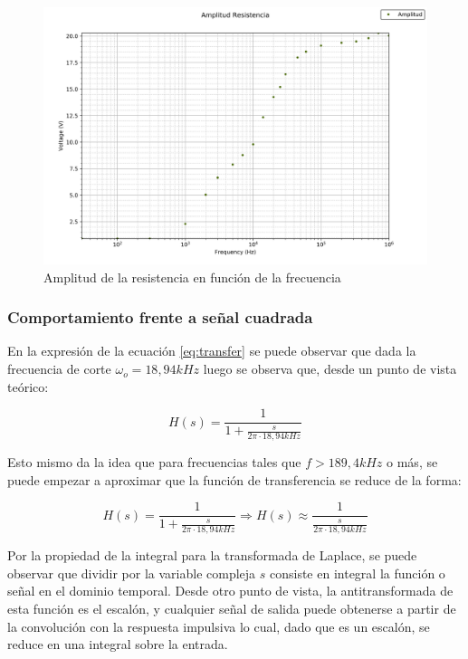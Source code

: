 \begin{figure}[H]
	\begin{center}
		\includegraphics[scale=0.65]{../Desarrollo/amplitud_resistencia.png}
		\caption{Amplitud de la resistencia en funci\'on de la frecuencia}
		\label{fig:amplitud_resistencia}
	\end{center}
\end{figure}

\subsubsection*{Comportamiento frente a se\~nal cuadrada}

En la expresi\'on de la ecuaci\'on \ref{eq:transfer} se puede observar que dada la frecuencia de corte $\omega_o = 18,94kHz$ luego se observa que, desde un punto de vista te\'orico:

\begin{equation}
	H(s) = \frac{1}{1 + \frac{s}{2 \pi \cdot 18,94kHz}}
\end{equation}

Esto mismo da la idea que para frecuencias tales que $f > 189,4kHz$ o m\'as, se puede empezar a aproximar que la funci\'on de transferencia se reduce de la forma:

\begin{equation}
	H(s) = \frac{1}{1 + \frac{s}{2 \pi \cdot 18,94kHz}} \Rightarrow
	H(s) \approx \frac{1}{\frac{s}{2 \pi \cdot 18,94kHz}}
\end{equation}

Por la propiedad de la integral para la transformada de Laplace, se puede observar que dividir por la variable compleja $s$ consiste en integral la funci\'on o se\~nal en el dominio temporal. Desde otro punto de vista, la antitransformada de esta funci\'on es el escal\'on, y cualquier se\~nal de salida puede obtenerse a partir de la convoluci\'on con la respuesta impulsiva lo cual, dado que es un escal\'on, se reduce en una integral sobre la entrada.

